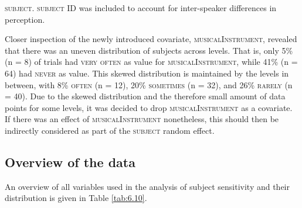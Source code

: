 \textsc{subject}. \textsc{subject} ID was included to account for inter-speaker differences in perception.

Closer inspection of the newly introduced covariate, \textsc{musicalInstrument}, revealed that there was an uneven distribution of subjects across levels. That is, only 5\% (n = 8) of trials had \textsc{very often} as value for \textsc{musicalInstrument}, while 41\% (n = 64) had \textsc{never} as value. This skewed distribution is maintained by the levels in between, with 8\% \textsc{often} (n = 12), 20\% \textsc{sometimes} (n = 32), and 26\% \textsc{rarely} (n = 40). Due to the skewed distribution and the therefore small amount of data points for some levels, it was decided to drop \textsc{musicalInstrument} as a covariate. If there was an effect of \textsc{musicalInstrument} nonetheless, this should then be indirectly considered as part of the \textsc{subject} random effect.

\subsection{Overview of the data}\label{section06_2_2}

An overview of all variables used in the analysis of subject sensitivity and their distribution is given in Table \ref{tab:6.10}.

